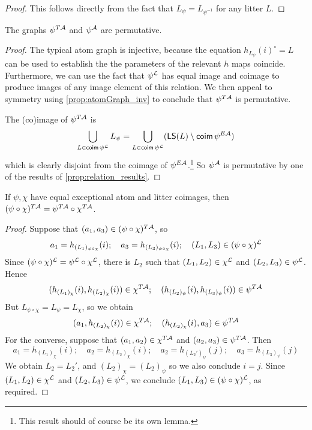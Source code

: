 \begin{proof}
  This follows directly from the fact that \( L_\psi = L_{\psi^{-1}} \) for any litter \( L \).
\end{proof}
\begin{proposition}
  \label{prop:atomGraph_permutative}
  The graphs \( \psi^{T{\mathcal A}} \) and \( \psi^{\mathcal A} \) are permutative.
\end{proposition}
\begin{proof}
  The typical atom graph is injective, because the equation \( h_{L_\psi}(i)^\circ = L \) can be used to establish the the parameters of the relevant \( h \) maps coincide.
  Furthermore, we can use the fact that \( \psi^{\mathcal L} \) has equal image and coimage to produce images of any image element of this relation.
  We then appeal to symmetry using \cref{prop:atomGraph_inv} to conclude that \( \psi^{T{\mathcal A}} \) is permutative.

  The (co)image of \( \psi^{T{\mathcal A}} \) is
  \[ \bigcup_{L \in \operatorname{\mathsf{coim}} \psi^{\mathcal L}} L_\psi = \bigcup_{L \in \operatorname{\mathsf{coim}} \psi^{\mathcal L}} (\operatorname{\mathsf{LS}}(L) \setminus \operatorname{\mathsf{coim}} \psi^{E{\mathcal A}}) \]
  which is clearly disjoint from the coimage of \( \psi^{E{\mathcal A}} \).\footnote{This result should of course be its own lemma.}
  So \( \psi^{\mathcal A} \) is permutative by one of the results of \cref{prop:relation_results}.
\end{proof}
\begin{proposition}
  \label{prop:comp_atomGraph}
  If \( \psi, \chi \) have equal exceptional atom and litter coimages, then \( (\psi \circ \chi)^{T{\mathcal A}} = \psi^{T{\mathcal A}} \circ \chi^{T{\mathcal A}} \).
\end{proposition}
\begin{proof}
  Suppose that \( (a_1, a_3) \in (\psi \circ \chi)^{T{\mathcal A}} \), so
  \[ a_1 = h_{(L_1)_{\psi \circ \chi}}(i);\quad a_3 = h_{(L_3)_{\psi \circ \chi}}(i);\quad (L_1, L_3) \in (\psi \circ \chi)^{\mathcal L} \]
  Since \( (\psi \circ \chi)^{\mathcal L} = \psi^{\mathcal L} \circ \chi^{\mathcal L} \), there is \( L_2 \) such that \( (L_1, L_2) \in \chi^{\mathcal L} \) and \( (L_2, L_3) \in \psi^{\mathcal L} \).
  Hence
  \[ (h_{(L_1)_\chi}(i), h_{(L_2)_\chi}(i)) \in \chi^{T{\mathcal A}};\quad (h_{(L_2)_\psi}(i), h_{(L_3)_\psi}(i)) \in \psi^{T{\mathcal A}} \]
  But \( L_{\psi \circ \chi} = L_\psi = L_\chi \), so we obtain
  \[ (a_1, h_{(L_2)_\chi}(i)) \in \chi^{T{\mathcal A}};\quad (h_{(L_2)_\chi}(i), a_3) \in \psi^{T{\mathcal A}} \]
  For the converse, suppose that \( (a_1, a_2) \in \chi^{T{\mathcal A}} \) and \( (a_2, a_3) \in \psi^{T{\mathcal A}} \).
  Then
  \[ a_1 = h_{(L_1)_\chi}(i);\quad a_2 = h_{(L_2)_\chi}(i);\quad a_2 = h_{(L_2')_\psi}(j);\quad a_3 = h_{(L_3)_\psi}(j) \]
  We obtain \( L_2 = L_2' \), and \( (L_2)_\chi = (L_2)_\psi \) so we also conclude \( i = j \).
  Since \( (L_1, L_2) \in \chi^{\mathcal L} \) and \( (L_2, L_3) \in \psi^{\mathcal L} \), we conclude \( (L_1, L_3) \in (\psi \circ \chi)^{\mathcal L} \), as required.
\end{proof}
